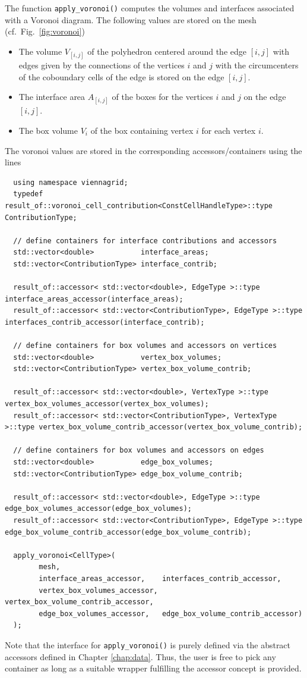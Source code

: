  The function \lstinline|apply_voronoi()| computes the volumes and interfaces associated with a Voronoi diagram. The following values are stored on the mesh (cf.~Fig.~\ref{fig:voronoi})
 \begin{itemize}
  \item The volume $V_{[i,j]}$ of the polyhedron centered around the edge $[i,j]$ with edges given by the connections of the vertices $i$ and $j$ with the circumcenters of the coboundary cells of the edge is stored on the edge $[i,j]$.
  \item The interface area $A_{[i,j]}$ of the boxes for the vertices $i$ and $j$ on the edge $[i,j]$.
  \item The box volume $V_i$ of the box containing vertex $i$ for each vertex $i$.
 \end{itemize}
 The voronoi values are stored in the corresponding accessors/containers using the lines
 \begin{lstlisting}
  using namespace viennagrid;
  typedef result_of::voronoi_cell_contribution<ConstCellHandleType>::type ContributionType;

  // define containers for interface contributions and accessors
  std::vector<double>           interface_areas;
  std::vector<ContributionType> interface_contrib;

  result_of::accessor< std::vector<double>, EdgeType >::type           interface_areas_accessor(interface_areas);
  result_of::accessor< std::vector<ContributionType>, EdgeType >::type interfaces_contrib_accessor(interface_contrib);

  // define containers for box volumes and accessors on vertices
  std::vector<double>           vertex_box_volumes;
  std::vector<ContributionType> vertex_box_volume_contrib;

  result_of::accessor< std::vector<double>, VertexType >::type           vertex_box_volumes_accessor(vertex_box_volumes);
  result_of::accessor< std::vector<ContributionType>, VertexType >::type vertex_box_volume_contrib_accessor(vertex_box_volume_contrib);

  // define containers for box volumes and accessors on edges
  std::vector<double>           edge_box_volumes;
  std::vector<ContributionType> edge_box_volume_contrib;

  result_of::accessor< std::vector<double>, EdgeType >::type           edge_box_volumes_accessor(edge_box_volumes);
  result_of::accessor< std::vector<ContributionType>, EdgeType >::type edge_box_volume_contrib_accessor(edge_box_volume_contrib);

  apply_voronoi<CellType>(
        mesh,
        interface_areas_accessor,    interfaces_contrib_accessor,
        vertex_box_volumes_accessor, vertex_box_volume_contrib_accessor,
        edge_box_volumes_accessor,   edge_box_volume_contrib_accessor)
  );
 \end{lstlisting}
 Note that the interface for \lstinline|apply_voronoi()| is purely defined via the abstract accessors defined in Chapter \ref{chap:data}.
 Thus, the user is free to pick any container as long as a suitable wrapper fulfilling the accessor concept is provided.
 
